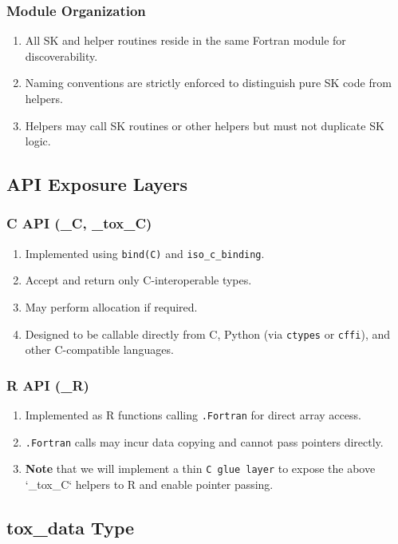 \documentclass{article}
\begin{document}
\subsubsection{Module Organization}
\begin{enumerate}
  \item All SK and helper routines reside in the same Fortran module for discoverability.
  \item Naming conventions are strictly enforced to distinguish pure SK code from helpers.
  \item Helpers may call SK routines or other helpers but must not duplicate SK logic.
\end{enumerate}

\subsection{API Exposure Layers}

\subsubsection{C API (\_C, \_tox\_C)}
\begin{enumerate}
  \item Implemented using \texttt{bind(C)} and \texttt{iso\_c\_binding}.
  \item Accept and return only C-interoperable types.
  \item May perform allocation if required.
  \item Designed to be callable directly from C, Python (via \texttt{ctypes} or \texttt{cffi}), and other C-compatible languages.
\end{enumerate}

\subsubsection{R API (\_R)}
\begin{enumerate}
  \item Implemented as R functions calling \texttt{.Fortran} for direct array access.
  \item \texttt{.Fortran} calls may incur data copying and cannot pass pointers directly.
  \item \textbf{Note} that we will implement a thin \texttt{C glue layer} to
    expose the above `\_tox\_C` helpers to R and enable pointer passing.
\end{enumerate}

\subsection{tox\_data Type}
\end{document}
